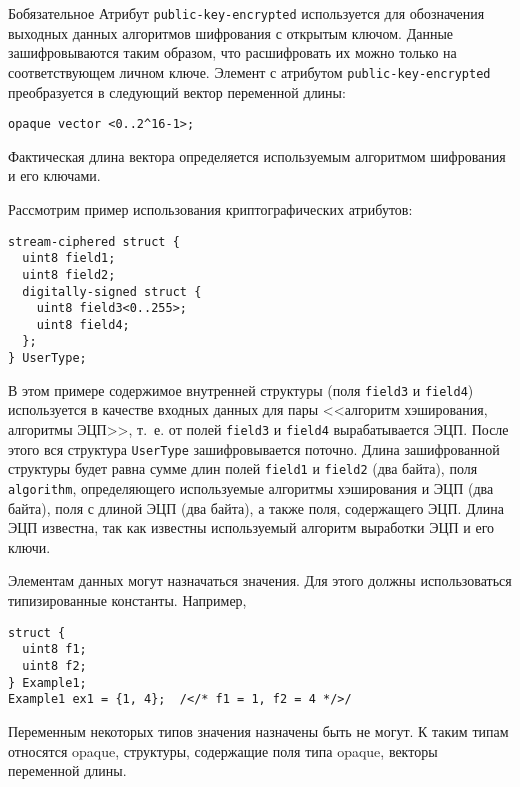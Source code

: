 \begin{appendix}{Б}{обязательное}
Атрибут \lstinline{public-key-encrypted} используется для обозначения выходных данных 
алгоритмов шифрования с открытым ключом. Данные зашифровываются таким 
образом, что расшифровать их можно только на соответствующем личном ключе. 
Элемент с атрибутом \lstinline{public-key-encrypted} преобразуется в 
следующий вектор переменной длины: 
\begin{lstlisting}
opaque vector <0..2^16-1>; 
\end{lstlisting}

Фактическая длина вектора определяется используемым алгоритмом шифрования 
и его ключами. 

Рассмотрим пример использования криптографических атрибутов:
\begin{lstlisting}
stream-ciphered struct {
  uint8 field1;
  uint8 field2;
  digitally-signed struct {
    uint8 field3<0..255>;
    uint8 field4;
  };
} UserType;
\end{lstlisting}

В этом примере содержимое внутренней структуры (поля \lstinline{field3} и
\lstinline{field4}) используется в качестве входных данных для пары
<<алгоритм хэширования, алгоритмы ЭЦП>>, т.~е. от полей \lstinline{field3}
и \lstinline{field4} вырабатывается ЭЦП. После этого вся структура
\lstinline{UserType} зашифровывается поточно. Длина
зашифрованной структуры будет равна сумме длин полей \lstinline{field1} и
\lstinline{field2} (два байта), поля \lstinline{algorithm}, определяющего
используемые алгоритмы хэширования и ЭЦП (два байта), поля с длиной ЭЦП
(два байта), а также поля, содержащего ЭЦП. Длина ЭЦП известна, так как
известны используемый алгоритм выработки ЭЦП и его ключи.

\label{SYNTAX.8}

Элементам данных могут назначаться значения. Для этого должны 
использоваться типизированные константы. Например, 
\begin{lstlisting}
struct {
  uint8 f1;
  uint8 f2;
} Example1;
Example1 ex1 = {1, 4};  /</* f1 = 1, f2 = 4 */>/
\end{lstlisting}

Переменным некоторых типов значения назначены быть не могут. К таким типам 
относятся opaque, структуры, содержащие поля типа opaque, векторы 
переменной длины. 

\end{appendix}

